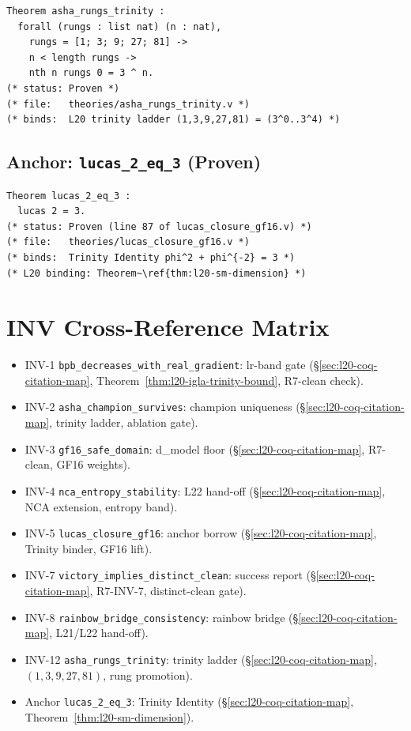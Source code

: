 \begin{verbatim}
Theorem asha_rungs_trinity :
  forall (rungs : list nat) (n : nat),
    rungs = [1; 3; 9; 27; 81] ->
    n < length rungs ->
    nth n rungs 0 = 3 ^ n.
(* status: Proven *)
(* file:   theories/asha_rungs_trinity.v *)
(* binds:  L20 trinity ladder (1,3,9,27,81) = (3^0..3^4) *)
\end{verbatim}


\subsection{Anchor: \texttt{lucas\_2\_eq\_3} (Proven)}

\begin{verbatim}
Theorem lucas_2_eq_3 :
  lucas 2 = 3.
(* status: Proven (line 87 of lucas_closure_gf16.v) *)
(* file:   theories/lucas_closure_gf16.v *)
(* binds:  Trinity Identity phi^2 + phi^{-2} = 3 *)
(* L20 binding: Theorem~\ref{thm:l20-sm-dimension} *)
\end{verbatim}


\section{INV Cross-Reference Matrix}
\label{sec:l20-inv-matrix}

\begin{itemize}
  \item INV-1 \texttt{bpb\_decreases\_with\_real\_gradient}: lr-band gate (\S\ref{sec:l20-coq-citation-map}, Theorem~\ref{thm:l20-igla-trinity-bound}, R7-clean check).
  \item INV-2 \texttt{asha\_champion\_survives}: champion uniqueness (\S\ref{sec:l20-coq-citation-map}, trinity ladder, ablation gate).
  \item INV-3 \texttt{gf16\_safe\_domain}: d\_model floor (\S\ref{sec:l20-coq-citation-map}, R7-clean, GF16 weights).
  \item INV-4 \texttt{nca\_entropy\_stability}: L22 hand-off (\S\ref{sec:l20-coq-citation-map}, NCA extension, entropy band).
  \item INV-5 \texttt{lucas\_closure\_gf16}: anchor borrow (\S\ref{sec:l20-coq-citation-map}, Trinity binder, GF16 lift).
  \item INV-7 \texttt{victory\_implies\_distinct\_clean}: success report (\S\ref{sec:l20-coq-citation-map}, R7-INV-7, distinct-clean gate).
  \item INV-8 \texttt{rainbow\_bridge\_consistency}: rainbow bridge (\S\ref{sec:l20-coq-citation-map}, L21/L22 hand-off).
  \item INV-12 \texttt{asha\_rungs\_trinity}: trinity ladder (\S\ref{sec:l20-coq-citation-map}, $(1,3,9,27,81)$, rung promotion).
  \item Anchor \texttt{lucas\_2\_eq\_3}: Trinity Identity (\S\ref{sec:l20-coq-citation-map}, Theorem~\ref{thm:l20-sm-dimension}).
\end{itemize}

